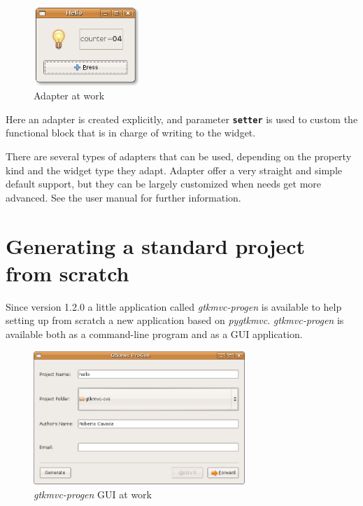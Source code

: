 \documentclass{article}
\newcommand{\kw}[1]{\emph{#1}\xspace}
\newcommand{\pygtkmvc}{\kw{pygtkmvc}}
\newcommand{\codename}[1]{\texttt{\bfseries \textcolor {codecolor}{#1}}\xspace}
\begin{document}
\begin{figure}[htbp]
\begin{center}
\includegraphics[width=4cm]{png/adap.png}
\caption{\label{fig:adap}Adapter at work}
\end{center}
\end{figure}

Here an adapter is created explicitly, and parameter
\codename{setter} is used to custom the functional block that is in
charge of writing to the widget.

There are several types of adapters that can be used, depending on
the property kind and the widget type they adapt. Adapter offer a
very straight and simple default support, but they can be largely
customized when needs get more advanced. See the user manual for
further information.


\section{Generating a standard project from scratch}

Since version 1.2.0 a little application called \kw{gtkmvc-progen}
is available to help setting up from scratch a new application based
on \pygtkmvc. \kw{gtkmvc-progen} is available both as a command-line
program and as a GUI application. 

\begin{figure}[htbp]
\begin{center}
\includegraphics[width=8cm]{png/progen.png}
\caption{\label{fig:progen}\kw{gtkmvc-progen} GUI at work}
\end{center}
\end{figure}
\end{document}
